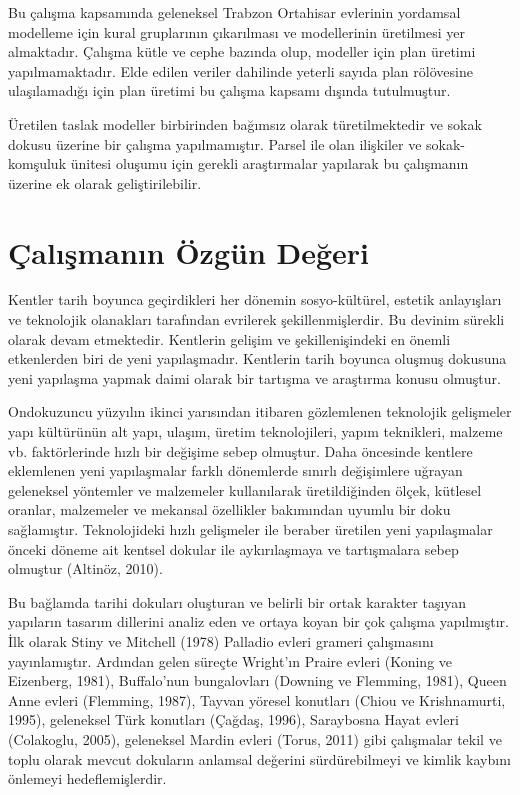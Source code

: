 \documentclass[12pt,turkish,a4paperpaper,]{report}
\begin{document}
Bu çalışma kapsamında geleneksel Trabzon Ortahisar evlerinin yordamsal
modelleme için kural gruplarının çıkarılması ve modellerinin üretilmesi
yer almaktadır. Çalışma kütle ve cephe bazında olup, modeller için plan
üretimi yapılmamaktadır. Elde edilen veriler dahilinde yeterli sayıda
plan rölövesine ulaşılamadığı için plan üretimi bu çalışma kapsamı
dışında tutulmuştur.

Üretilen taslak modeller birbirinden bağımsız olarak türetilmektedir ve
sokak dokusu üzerine bir çalışma yapılmamıştır. Parsel ile olan
ilişkiler ve sokak-komşuluk ünitesi oluşumu için gerekli araştırmalar
yapılarak bu çalışmanın üzerine ek olarak geliştirilebilir.

\hypertarget{uxe7alux131ux15fmanux131n-uxf6zguxfcn-deux11feri}{%
\section{Çalışmanın Özgün
Değeri}\label{uxe7alux131ux15fmanux131n-uxf6zguxfcn-deux11feri}}

Kentler tarih boyunca geçirdikleri her dönemin sosyo-kültürel, estetik
anlayışları ve teknolojik olanakları tarafından evrilerek
şekillenmişlerdir. Bu devinim sürekli olarak devam etmektedir. Kentlerin
gelişim ve şekillenişindeki en önemli etkenlerden biri de yeni
yapılaşmadır. Kentlerin tarih boyunca oluşmuş dokusuna yeni yapılaşma
yapmak daimi olarak bir tartışma ve araştırma konusu olmuştur.

Ondokuzuncu yüzyılın ikinci yarısından itibaren gözlemlenen teknolojik
gelişmeler yapı kültürünün alt yapı, ulaşım, üretim teknolojileri, yapım
teknikleri, malzeme vb. faktörlerinde hızlı bir değişime sebep olmuştur.
Daha öncesinde kentlere eklemlenen yeni yapılaşmalar farklı dönemlerde
sınırlı değişimlere uğrayan geleneksel yöntemler ve malzemeler
kullanılarak üretildiğinden ölçek, kütlesel oranlar, malzemeler ve
mekansal özellikler bakımından uyumlu bir doku sağlamıştır.
Teknolojideki hızlı gelişmeler ile beraber üretilen yeni yapılaşmalar
önceki döneme ait kentsel dokular ile aykırılaşmaya ve tartışmalara
sebep olmuştur (Altinöz, 2010).

Bu bağlamda tarihi dokuları oluşturan ve belirli bir ortak karakter
taşıyan yapıların tasarım dillerini analiz eden ve ortaya koyan bir çok
çalışma yapılmıştır. İlk olarak Stiny ve Mitchell (1978) Palladio evleri
grameri çalışmasını yayınlamıştır. Ardından gelen süreçte Wright'ın
Praire evleri (Koning ve Eizenberg, 1981), Buffalo'nun bungalovları
(Downing ve Flemming, 1981), Queen Anne evleri (Flemming, 1987), Tayvan
yöresel konutları (Chiou ve Krishnamurti, 1995), geleneksel Türk
konutları (Çağdaş, 1996), Saraybosna Hayat evleri (Colakoglu, 2005),
geleneksel Mardin evleri (Torus, 2011) gibi çalışmalar tekil ve toplu
olarak mevcut dokuların anlamsal değerini sürdürebilmeyi ve kimlik
kaybını önlemeyi hedeflemişlerdir.
\end{document}
